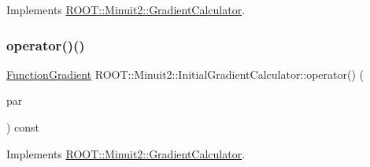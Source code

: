 Implements \mbox{\hyperlink{classROOT_1_1Minuit2_1_1GradientCalculator_a1bae913e96ffc9ece28664a5f6f79cb0}{R\+O\+O\+T\+::\+Minuit2\+::\+Gradient\+Calculator}}.

\mbox{\label{classROOT_1_1Minuit2_1_1InitialGradientCalculator_afae3b02315c3ed44cdd94dff4bd53462}} 
\subsubsection{\texorpdfstring{operator()()}{operator()()}\hspace{0.1cm}{\footnotesize\ttfamily [2/4]}}
{\footnotesize\ttfamily \mbox{\hyperlink{classROOT_1_1Minuit2_1_1FunctionGradient}{Function\+Gradient}} R\+O\+O\+T\+::\+Minuit2\+::\+Initial\+Gradient\+Calculator\+::operator() (\begin{DoxyParamCaption}\item[{const \mbox{\hyperlink{classROOT_1_1Minuit2_1_1MinimumParameters}{Minimum\+Parameters}} \&}]{par }\end{DoxyParamCaption}) const\hspace{0.3cm}{\ttfamily [virtual]}}



Implements \mbox{\hyperlink{classROOT_1_1Minuit2_1_1GradientCalculator_a1bae913e96ffc9ece28664a5f6f79cb0}{R\+O\+O\+T\+::\+Minuit2\+::\+Gradient\+Calculator}}.

